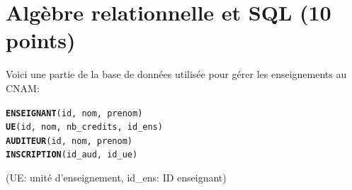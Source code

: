 
\section{Alg\`ebre relationnelle et SQL (10 points)}

Voici une partie de la base de donn\'ees utilis\'ee pour g\'erer les enseignements au CNAM:

\smallskip
\texttt{\textbf{ENSEIGNANT}(id, nom, prenom)}\\
\texttt{\textbf{UE}(id, nom, nb\_credits, id\_ens)}\\
\texttt{\textbf{AUDITEUR}(id, nom, prenom)}\\
\texttt{\textbf{INSCRIPTION}(id\_aud, id\_ue)}\\
\smallskip

(UE: unit\'e d'enseignement, id\_ens: ID enseignant)




